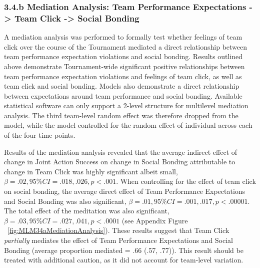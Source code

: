 \subsubsection{3.4.b Mediation Analysis: Team Performance Expectations -> Team Click -> Social Bonding}

A mediation analysis was performed to formally test whether feelings of team click over the course of the Tournament mediated a direct relationship between team performance expectation violations and social bonding.  Results outlined above demonstrate Tournament-wide significant positive relationships between team performance expectation violations and feelings of team click, as well as team click and social bonding. Models also demonstrate a direct relationship between expectations around team performance and social bonding.  Available statistical software can only support a 2-level structure for multilevel mediation analysis. The third team-level random effect was therefore dropped from the model, while the model controlled for the random effect of individual across each of the four time points.

Results of the mediation analysis revealed that the average indirect effect of change in Joint Action Success on change in Social Bonding attributable to change in Team Click was highly significant albeit small, $\beta = .02, 95\% CI = .018 , .026, p < .001$.  When controlling for the effect of team click on social bonding, the average direct effect of Team Performance Expectations and Social Bonding was also significant, $\beta = .01, 95\% CI = .001 , .017, p < .00001$.  The total effect of the meditation was also significant, $\beta = .03, 95\% CI = .027, .041, p < .0001$ (see Appendix Figure ~\ref{fig:MLM34aMediationAnalysis}).
These results suggest that Team Click \textit{partially} mediates the effect of Team Performance Expectations and Social Bonding (average proportion mediated = .66 (.57, .77)).  This result should be treated with additional caution, as it did not account for team-level variation.


